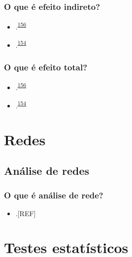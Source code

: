 \documentclass[
  a4paper,
]{book}
\providecommand{\tightlist}{%
  \setlength{\itemsep}{0pt}\setlength{\parskip}{0pt}}
\begin{document}
\hypertarget{o-que-uxe9-efeito-indireto}{%
\subsection{O que é efeito indireto?}\label{o-que-uxe9-efeito-indireto}}

\begin{itemize}
\item
  .\textsuperscript{\protect\hyperlink{ref-Baron1986}{156}}
\item
  .\textsuperscript{\protect\hyperlink{ref-Bours2023}{154}}
\end{itemize}

\hypertarget{o-que-uxe9-efeito-total}{%
\subsection{O que é efeito total?}\label{o-que-uxe9-efeito-total}}

\begin{itemize}
\item
  .\textsuperscript{\protect\hyperlink{ref-Baron1986}{156}}
\item
  .\textsuperscript{\protect\hyperlink{ref-Bours2023}{154}}
\end{itemize}

\hypertarget{analise-redes}{%
\chapter{\texorpdfstring{\textbf{Redes}}{Redes}}\label{analise-redes}}

\hypertarget{redes}{%
\section{Análise de redes}\label{redes}}

\hypertarget{o-que-uxe9-anuxe1lise-de-rede}{%
\subsection{O que é análise de rede?}\label{o-que-uxe9-anuxe1lise-de-rede}}

\begin{itemize}
\tightlist
\item
  .{[}REF{]}
\end{itemize}

\hypertarget{testes-estatisticos}{%
\chapter{\texorpdfstring{\textbf{Testes estatísticos}}{Testes estatísticos}}\label{testes-estatisticos}}
\end{document}
